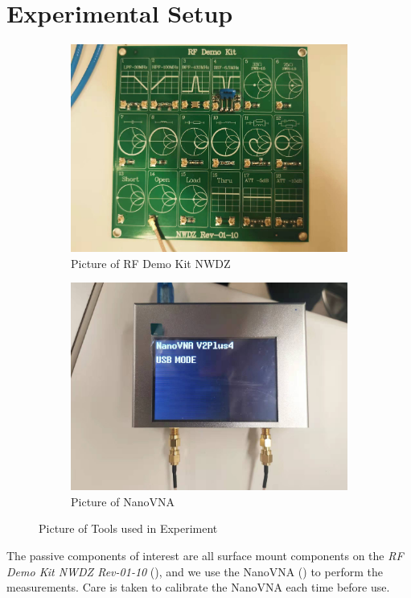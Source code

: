 \documentclass{article}
\begin{document}
\section{Experimental Setup}
\begin{figure}[h]
    \centering
    \begin{subfigure}{.5\linewidth}
        \centering
        \includegraphics[width=.8\linewidth]{./pics/test_loads.jpg}
        \caption{Picture of RF Demo Kit NWDZ}
        \label{fig:test_loads}
    \end{subfigure}%
    \begin{subfigure}{.5\linewidth}
        \centering
        \includegraphics[width=.8\linewidth]{./pics/NanoVNA.jpg}
        \caption{Picture of NanoVNA}
        \label{fig:nanovna}
    \end{subfigure}
    \caption{Picture of Tools used in Experiment}
\end{figure}

The passive components of interest are all surface mount components on the \emph{RF Demo Kit NWDZ Rev-01-10} (), and
we use the NanoVNA () to perform the measurements.
Care is taken to calibrate the NanoVNA each time before use.
\end{document}
